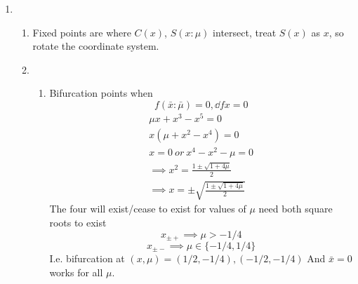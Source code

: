 \documentclass{/home/janmebows/Documents/LatexTemplates/myassignment}
\begin{document}
\begin{enumerate}
\begin{enumerate}
\end{enumerate}

    
    \item 
    \begin{enumerate}
        \item Fixed points are where $C(x)$, $S(x:\mu)$ intersect, treat $S(x)$ as $x$, so rotate the coordinate system.
        \item 
        \begin{enumerate}
            \item Bifurcation points when
            \[f(\bar x:\bar\mu) = 0, \dd fx = 0\]
            \begin{align*}
                \mu x + x^3 - x^5 = 0\\
                x(\mu + x^2 - x^4) = 0\\
                x= 0 \ or \ x^4 - x^2 -\mu=0 \\
                \implies x^2 = \frac{1\pm\sqrt{1+4\mu}}{2}\\
                \implies x = \pm \sqrt{\frac{1\pm\sqrt{1+4\mu}}{2}}
            \end{align*}
            The four will exist/cease to exist for values of $\mu$ need both square roots to exist
            \[x_{\pm+} \implies \mu > -1/4\]
            \[x_{\pm-} \implies \mu \in \{-1/4,1/4\}\]
            I.e. bifurcation at $(x,\mu) = (1/2,-1/4), (-1/2,-1/4)$
            And $\bar{x}=0$ works for all $\mu$.

\end{enumerate}
\end{enumerate}
\end{enumerate}
\end{document}
